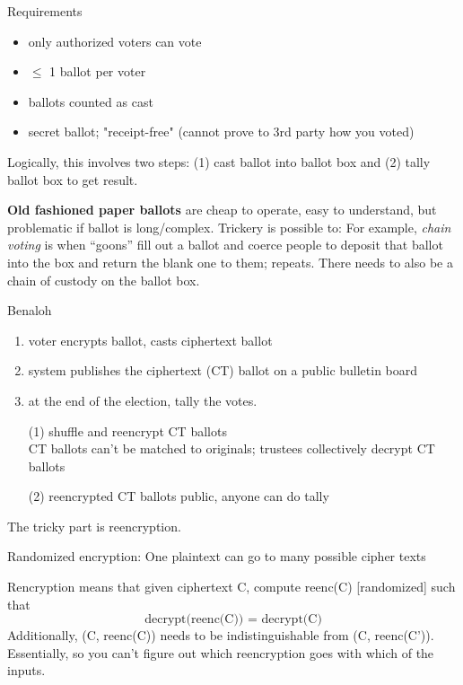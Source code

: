 
Requirements
\begin{itemize}
	\item only authorized voters can vote
	\item $\leq$ 1 ballot per voter
	\item ballots counted as cast
	\item secret ballot; "receipt-free" (cannot prove to 3rd party how you voted)
\end{itemize}

Logically, this involves two steps: (1) cast ballot into ballot box and (2) tally ballot box to get result.

\textbf{Old fashioned paper ballots} are cheap to operate, easy to understand, but problematic if ballot is long/complex. Trickery is possible to: For example, \textit{chain voting} is when ``goons'' fill out a ballot and coerce people to deposit that ballot into the box and return the blank one to them; repeats. There needs to also be a chain of custody on the ballot box.

\begin{example}
	Benaloh\\
	\begin{enumerate}
		\item voter encrypts ballot, casts ciphertext ballot
		\item system publishes the ciphertext (CT) ballot on a public bulletin board
		\item at the end of the election, tally the votes.

		(1) shuffle and reencrypt CT ballots\\
			CT ballots can't be matched to originals; trustees collectively decrypt CT ballots

		(2) reencrypted CT ballots public, anyone can do tally
	\end{enumerate}
\end{example}

The tricky part is reencryption.
\begin{definition}
Randomized encryption: One plaintext can go to many possible cipher texts
\end{definition}

\begin{definition}
Rencryption means that given ciphertext C, compute reenc(C) [randomized] such that
$$\text{decrypt(reenc(C)) = decrypt(C)}$$
Additionally, (C, reenc(C)) needs to be indistinguishable from (C, reenc(C')). Essentially, so you can't figure out which reencryption goes with which of the inputs.
\end{definition}


